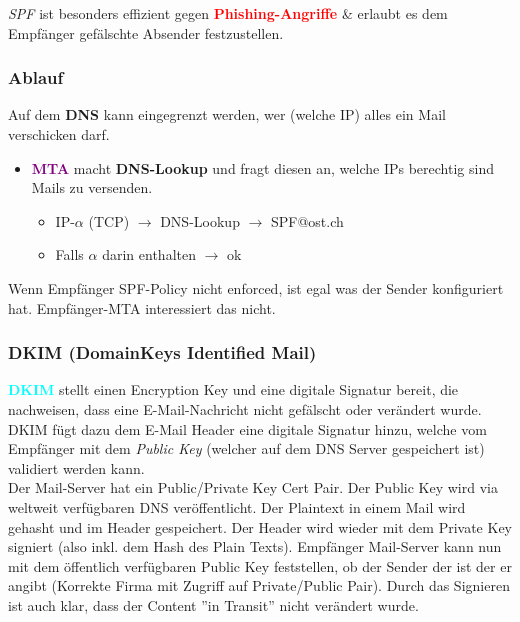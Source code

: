 \textit{SPF} ist besonders effizient gegen \textcolor{red}{\textbf{Phishing-Angriffe}} \& erlaubt es dem Empfänger gefälschte Absender festzustellen.

\subsubsection{Ablauf}
Auf dem \textbf{DNS} kann eingegrenzt werden, wer (welche IP) alles ein Mail verschicken darf.
\begin{itemize}
    \item \textcolor{purple}{\textbf{MTA}} macht \textbf{DNS-Lookup} und fragt diesen an, welche IPs berechtig sind Mails zu versenden.
    \begin{itemize}
        \item IP-$\alpha$ (TCP) $\rightarrow$ DNS-Lookup $\rightarrow$ SPF@ost.ch
        \item Falls $\alpha$ darin enthalten $\rightarrow$ ok
    \end{itemize}
\end{itemize}

Wenn Empfänger SPF-Policy nicht enforced, ist egal was der Sender konfiguriert hat. Empfänger-MTA interessiert das nicht.\\

\subsubsection{DKIM (DomainKeys Identified Mail)}
\textcolor{cyan}{\textbf{DKIM}} stellt einen Encryption Key und eine digitale Signatur bereit, die nachweisen, dass eine E-Mail-Nachricht nicht gefälscht oder verändert wurde.
DKIM fügt dazu dem E-Mail Header eine digitale Signatur hinzu, welche vom Empfänger mit dem \textit{Public Key} (welcher auf dem DNS Server gespeichert ist) validiert werden kann.\\

Der Mail-Server hat ein Public/Private Key Cert Pair. Der Public Key wird via weltweit verfügbaren DNS veröffentlicht. 
Der Plaintext in einem Mail wird gehasht und im Header gespeichert. 
Der Header wird wieder mit dem Private Key signiert (also inkl. dem Hash des Plain Texts). 
Empfänger Mail-Server kann nun mit dem öffentlich verfügbaren Public Key feststellen, ob der Sender der ist der er angibt (Korrekte Firma mit Zugriff auf Private/Public Pair). 
Durch das Signieren ist auch klar, dass der Content ''in Transit'' nicht verändert wurde.\\

